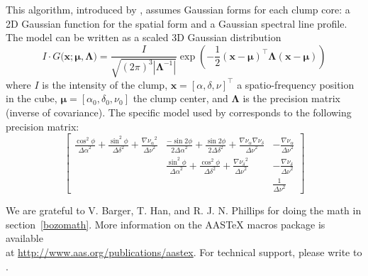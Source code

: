\documentclass[manuscript]{aastex}
\newcommand{\vl}[1]{{\mathbf #1}}
\newcommand{\vs}[1]{{\boldsymbol #1}}
\begin{document}
This algorithm, introduced by \citep{Stutzki}, assumes Gaussian forms for 
each clump core: a 2D Gaussian function for the spatial form and a
Gaussian spectral line profile. The model can be written as a scaled 
3D Gaussian distribution
\begin{equation}
I\cdot{G(\vl{x};\vs{\mu},\vs{\Lambda}}) =\frac{I}{\sqrt{(2\pi)^3|\vs{\Lambda}^{-1}|}}
\exp\left(-\frac{1}{2}({\vl{x}}-{\vs{\mu}})^\top{\vs{\Lambda}}({\vl{x}}-{\vs{\mu}})\right)
\end{equation}
where $I$ is the intensity of the clump, $\vl{x} = [ \alpha,\delta,\nu ]^\top$
a spatio-frequency position in the cube, $\vs{\mu} = [ \alpha_0,\delta_0,\nu_0 ]$ the 
clump center, and $\vs{\Lambda}$ is the precision matrix (inverse of
covariance). The specific model used by \citet{Stutzki} corresponds to the
following precision matrix:
\begin{equation}
\left[ \begin{array}{ccc}
\frac{\cos^2\phi}{{\Delta \alpha}^2} + \frac{\sin^2\phi}{{\Delta \delta}^2} +
\frac{{\nabla \nu_\alpha}^2}{{\Delta \nu}^2} &
\frac{-\sin2\phi}{2{\Delta \alpha}^2} + \frac{\sin2\phi}{2{\Delta \delta}^2} +
\frac{{\nabla \nu_\alpha} {\nabla \nu_\delta} }{{\Delta \nu}^2} & 
- \frac{{\nabla \nu_\alpha}}{{\Delta \nu}^2} \\
 &
\frac{\sin^2\phi}{{\Delta \alpha}^2} + \frac{\cos^2\phi}{{\Delta \delta}^2} +
\frac{{\nabla \nu_\delta}^2}{{\Delta \nu}^2} &
- \frac{{\nabla \nu_\delta}}{{\Delta \nu}^2} \\
 &
 &
\frac{1}{{\Delta \nu}^2}
\end{array} \right]
\end{equation}



\acknowledgments

We are grateful to V. Barger, T. Han, and R. J. N. Phillips for
doing the math in section~\ref{bozomath}.
More information on the AASTeX macros package is available \\ at
\url{http://www.aas.org/publications/aastex}.
For technical support, please write to
.

\end{document}
